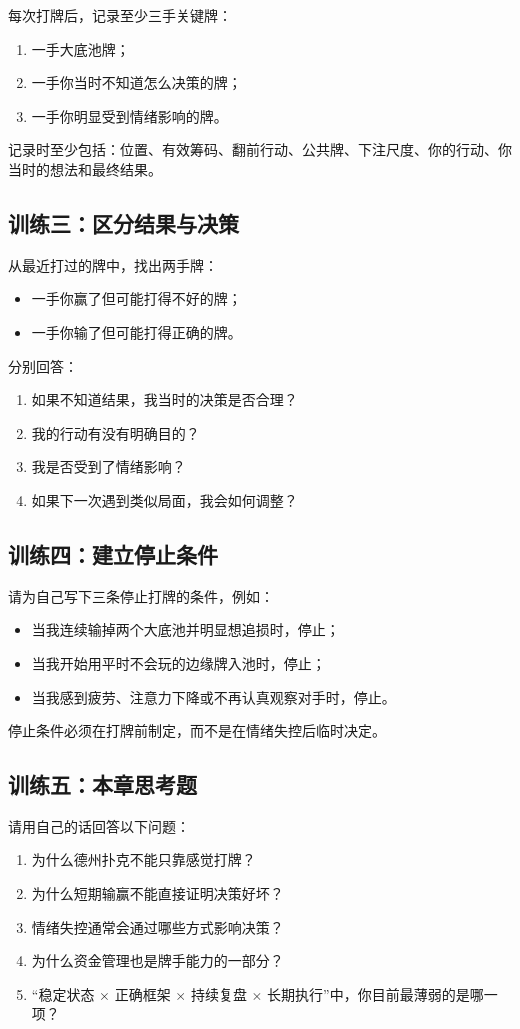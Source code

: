 每次打牌后，记录至少三手关键牌：

\begin{enumerate}
\item 一手大底池牌；
\item 一手你当时不知道怎么决策的牌；
\item 一手你明显受到情绪影响的牌。
\end{enumerate}

记录时至少包括：位置、有效筹码、翻前行动、公共牌、下注尺度、你的行动、你当时的想法和最终结果。

\subsection*{训练三：区分结果与决策}

从最近打过的牌中，找出两手牌：

\begin{itemize}
\item 一手你赢了但可能打得不好的牌；
\item 一手你输了但可能打得正确的牌。
\end{itemize}

分别回答：

\begin{enumerate}
\item 如果不知道结果，我当时的决策是否合理？
\item 我的行动有没有明确目的？
\item 我是否受到了情绪影响？
\item 如果下一次遇到类似局面，我会如何调整？
\end{enumerate}

\subsection*{训练四：建立停止条件}

请为自己写下三条停止打牌的条件，例如：

\begin{itemize}
\item 当我连续输掉两个大底池并明显想追损时，停止；
\item 当我开始用平时不会玩的边缘牌入池时，停止；
\item 当我感到疲劳、注意力下降或不再认真观察对手时，停止。
\end{itemize}

停止条件必须在打牌前制定，而不是在情绪失控后临时决定。

\subsection*{训练五：本章思考题}

请用自己的话回答以下问题：

\begin{enumerate}
\item 为什么德州扑克不能只靠感觉打牌？
\item 为什么短期输赢不能直接证明决策好坏？
\item 情绪失控通常会通过哪些方式影响决策？
\item 为什么资金管理也是牌手能力的一部分？
\item “稳定状态 $\times$ 正确框架 $\times$ 持续复盘 $\times$ 长期执行”中，你目前最薄弱的是哪一项？
\end{enumerate}
